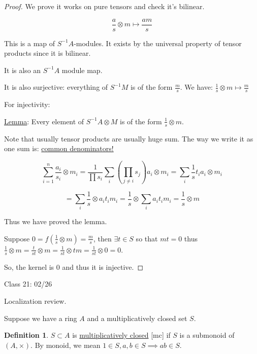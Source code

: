 \documentclass{article}
\theoremstyle{definition}
\newtheorem{definition}{Definition}
\begin{document}
\begin{proof}
    We prove it works on pure tensors and check it's bilinear.

    \[
        \frac{a}{s} \otimes m \mapsto \frac{am}{s}
    \]

    This is a map of \(S ^{-1} A\)-modules. It exists by the universal property of tensor products since it is bilinear.

    It is also an \(S ^{-1} A\) module map.

    It is also surjective: everything of \(S ^{-1} M\) is of the form \(\frac{m}{s}\). We have: \(\frac{1}{s} \otimes m \mapsto \frac{m}{s}\) 

    For injectivity:

    \underline{Lemma}: Every element of \(S ^{-1} A \otimes M\) is of the form \(\frac{1}{s} \otimes m\).

    Note that usually tensor products are usually huge sum. The way we write it as one sum is: \underline{common denominators!}

    \[
        \sum_{i=1}^{n} \frac{a_i}{s_i} \otimes m_i = \frac{1}{\prod s_i} \sum_{i}\left(\prod_{j \neq i} s_j\right)a_i \otimes m_i = \sum_{i}^{} \frac{1}{s} t_i a_i \otimes m_i
    \]

    \[
        = \sum_{i}^{} \frac{1}{s}\otimes a_i t_i m_i = \frac{1}{s} \otimes \sum_{i} a_i t_i m_i = \frac{1}{s} \otimes m
    \]

    Thus we have proved the lemma.

    Suppose \(0 = f(\frac{1}{s} \otimes m) = \frac{m}{s}\), then \(\exists t\in S\) so that \(mt = 0\) thus \(\frac{1}{s} \otimes m = \frac{t}{st} \otimes m = \frac{1}{st} \otimes tm = \frac{1}{st} \otimes 0 = 0\).

    So, the kernel is \(0\) and thus it is injective.

\end{proof}

\hrulefill

Class 21: 02/26

Localization review.

Suppose we have a ring \(A\) and a multiplicatively closed set \(S\).

\begin{definition}
    \(S \subset A\) is \underline{multiplicatively closed} [mc] if \(S\) is a submonoid of \((A,\times)\). By monoid, we mean \(1\in S, a,b\in S \implies ab\in S\).
\end{definition}
\end{document}
